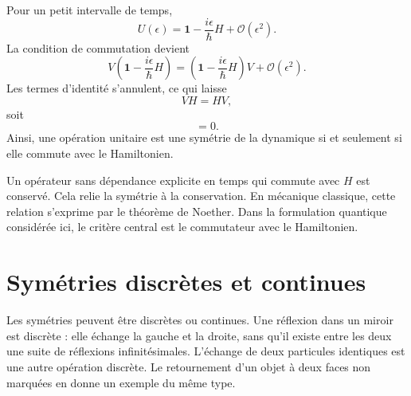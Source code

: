 \begin{classroomqa}
\end{classroomqa}

Pour un petit intervalle de temps,
\begin{equation}
U(\epsilon)
=
\mathbf 1-\frac{i\epsilon}{\hbar}H
+\mathcal O(\epsilon^2).
\end{equation}
La condition de commutation devient
\begin{equation}
V\left(
\mathbf 1-\frac{i\epsilon}{\hbar}H
\right)
=
\left(
\mathbf 1-\frac{i\epsilon}{\hbar}H
\right)V
+\mathcal O(\epsilon^2).
\end{equation}
Les termes d’identité s’annulent, ce qui laisse
\begin{equation}
VH=HV,
\end{equation}
soit
\begin{equation}
[V,H]=0.
\end{equation}
Ainsi, une opération unitaire est une symétrie de la dynamique si et seulement si elle commute avec le Hamiltonien.

\begin{classroomqa}
\end{classroomqa}

Un opérateur sans dépendance explicite en temps qui commute avec \(H\) est conservé. Cela relie la symétrie à la conservation. En mécanique classique, cette relation s’exprime par le théorème de Noether. Dans la formulation quantique considérée ici, le critère central est le commutateur avec le Hamiltonien.

\section{Symétries discrètes et continues}

Les symétries peuvent être discrètes ou continues. Une réflexion dans un miroir est discrète : elle échange la gauche et la droite, sans qu’il existe entre les deux une suite de réflexions infinitésimales. L’échange de deux particules identiques est une autre opération discrète. Le retournement d’un objet à deux faces non marquées en donne un exemple du même type.

